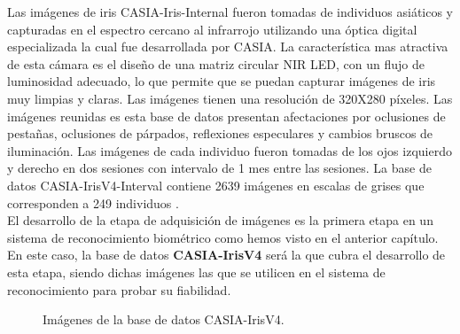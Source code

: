 Las imágenes de iris CASIA-Iris-Internal fueron tomadas de individuos asiáticos y capturadas en el espectro cercano al infrarrojo utilizando una óptica digital especializada la cual fue desarrollada por CASIA. La característica mas atractiva de esta cámara es el diseño de una matriz circular NIR LED, con un flujo de luminosidad adecuado, lo que permite que se puedan capturar imágenes de iris muy limpias y claras. Las imágenes tienen una resolución de 320X280 píxeles. Las imágenes reunidas es esta base de datos presentan afectaciones por oclusiones de pestañas, oclusiones de párpados, reflexiones especulares y cambios bruscos de iluminación. Las imágenes de cada individuo fueron tomadas de los ojos izquierdo y derecho en dos sesiones con intervalo de 1 mes entre las sesiones. La base de datos CASIA-IrisV4-Interval contiene 2639 imágenes en escalas de grises que corresponden a 249 individuos \cite{Reference20}. \\

El desarrollo de la etapa de adquisición de imágenes es la primera etapa en un sistema de reconocimiento biométrico como hemos visto en el anterior capítulo. En este caso, la base de datos \textbf{CASIA-IrisV4} será la que cubra el desarrollo de esta etapa, siendo dichas imágenes las que se utilicen en el sistema de reconocimiento para probar su fiabilidad. \\

\begin{figure}[htbp]
\centering
{}
\caption{Imágenes de la base de datos CASIA-IrisV4.} \label{fig:señales}
\end{figure}

